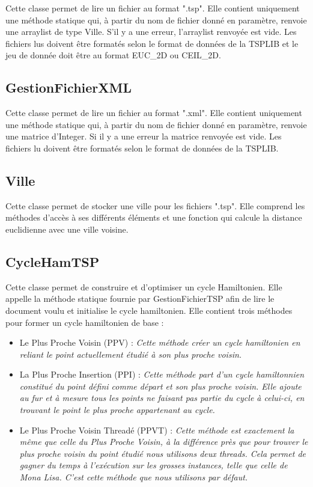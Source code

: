 \documentclass{article}
\begin{document}
Cette classe permet de lire un fichier au format ".tsp".
Elle contient uniquement une méthode statique qui, à partir du nom de fichier donné en paramètre, renvoie une arraylist de type Ville.
S'il y a une erreur, l'arraylist renvoyée est vide.
Les fichiers lus doivent être formatés selon le format de données de la TSPLIB et le jeu de donnée doit être au format EUC\_2D ou CEIL\_2D.

\subsection{GestionFichierXML}

Cette classe permet de lire un fichier au format ".xml".
Elle contient uniquement une méthode statique qui, à partir du nom de fichier donné en paramètre, renvoie une matrice d'Integer.
Si il y a une erreur la matrice renvoyée est vide.
Les fichiers lu doivent être formatés selon le format de données de la TSPLIB.

\subsection{Ville}

Cette classe permet de stocker une ville pour les fichiers ".tsp".
Elle comprend les méthodes d'accès à ses différents éléments et une fonction qui calcule la distance euclidienne avec une ville voisine.

\subsection{CycleHamTSP}

Cette classe permet de construire et d'optimiser un cycle Hamiltonien.
Elle appelle la méthode statique fournie par GestionFichierTSP afin de lire le document voulu et initialise le cycle hamiltonien.
Elle contient trois méthodes pour former un cycle hamiltonien de base :

\begin{itemize}
\item Le Plus Proche Voisin (PPV) : \emph{Cette méthode créer un cycle hamiltonien en reliant le point actuellement étudié à son plus proche voisin.}\smallskip

\item La Plus Proche Insertion (PPI) : \emph{Cette méthode part d'un cycle hamiltonnien constitué du point défini comme départ et son plus proche voisin. Elle ajoute au fur et à mesure tous les points ne faisant pas partie du cycle à celui-ci, en trouvant le point le plus proche appartenant au cycle.}\smallskip

\item Le Plus Proche Voisin Threadé (PPVT) : \emph{Cette méthode est exactement la même que celle du Plus Proche Voisin, à la différence près que pour trouver le plus proche voisin du point étudié nous utilisons deux threads. Cela permet de gagner du temps à l'exécution sur les grosses instances, telle que celle de Mona Lisa. C'est cette méthode que nous utilisons par défaut.}
\end{itemize}
\end{document}
